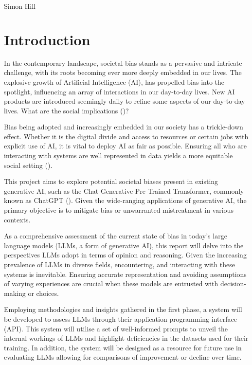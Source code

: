 \documentclass[12pt]{article}
\begin{document}
Simon Hill

\date{\today}

\newpage

\tableofcontents

\newpage

\section{Introduction}
 
In the contemporary landscape, societal bias stands as a pervasive and intricate challenge, with its roots becoming ever more deeply embedded in our lives. The explosive growth of Artificial Intelligence (AI), has propelled bias into the spotlight, influencing an array of interactions in our day-to-day lives. New AI products are introduced seemingly daily to refine some aspects of our day-to-day lives. What are the social implications (\cite{heikkila-2024})?

Bias being adopted and increasingly embedded in our society has a trickle-down effect. Whether it is the digital divide and access to resources or certain jobs with explicit use of AI, it is vital to deploy AI as fair as possible. Ensuring all who are interacting with systems are well represented in data yields a more equitable social setting (\cite{digital-divide-age-of-ai}).

This project aims to explore potential societal biases present in existing generative AI, such as the Chat Generative Pre-Trained Transformer, commonly known as ChatGPT (\cite{openai-intro-chatgpt}). Given the wide-ranging applications of generative AI, the primary objective is to mitigate bias or unwarranted mistreatment in various contexts.

As a comprehensive assessment of the current state of bias in today's large language models (LLMs, a form of generative AI), this report will delve into the perspectives LLMs adopt in terms of opinion and reasoning. Given the increasing prevalence of LLMs in diverse fields, encountering, and interacting with these systems is inevitable. Ensuring accurate representation and avoiding assumptions of varying experiences are crucial when these models are entrusted with decision-making or choices. 

Employing methodologies and insights gathered in the first phase, a system will be developed to assess LLMs through their application programming interface (API). This system will utilise a set of well-informed prompts to unveil the internal workings of LLMs and highlight deficiencies in the datasets used for their training. In addition, the system will be designed as a resource for future use in evaluating LLMs allowing for comparisons of improvement or decline over time.
\end{document}

